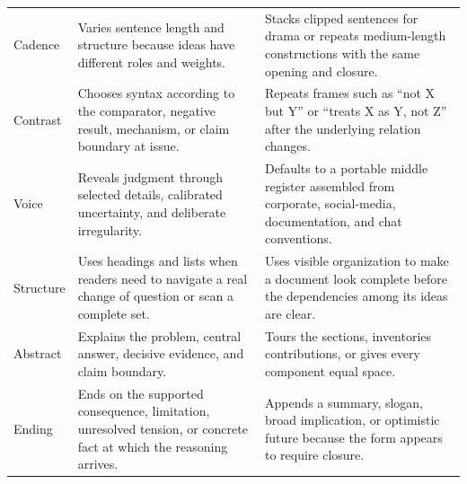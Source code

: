 \begin{longtable}{@{}>{\raggedright\arraybackslash}p{}
  >{\raggedright\arraybackslash}p{}
  >{\raggedright\arraybackslash}p{}@{}}
Cadence &
Varies sentence length and structure because ideas have different roles and
weights. &
Stacks clipped sentences for drama or repeats medium-length constructions with
the same opening and closure. \\
\addlinespace

Contrast &
Chooses syntax according to the comparator, negative result, mechanism, or
claim boundary at issue. &
Repeats frames such as ``not X but Y'' or ``treats X as Y, not Z'' after the
underlying relation changes. \\
\addlinespace

Voice &
Reveals judgment through selected details, calibrated uncertainty, and
deliberate irregularity. &
Defaults to a portable middle register assembled from corporate, social-media,
documentation, and chat conventions. \\
\addlinespace

Structure &
Uses headings and lists when readers need to navigate a real change of question
or scan a complete set. &
Uses visible organization to make a document look complete before the
dependencies among its ideas are clear. \\
\addlinespace

Abstract &
Explains the problem, central answer, decisive evidence, and claim boundary. &
Tours the sections, inventories contributions, or gives every component equal
space. \\
\addlinespace

Ending &
Ends on the supported consequence, limitation, unresolved tension, or
concrete fact at which the reasoning arrives. &
Appends a summary, slogan, broad implication, or optimistic future because the
form appears to require closure. \\

\bottomrule
\end{longtable}
\endgroup
